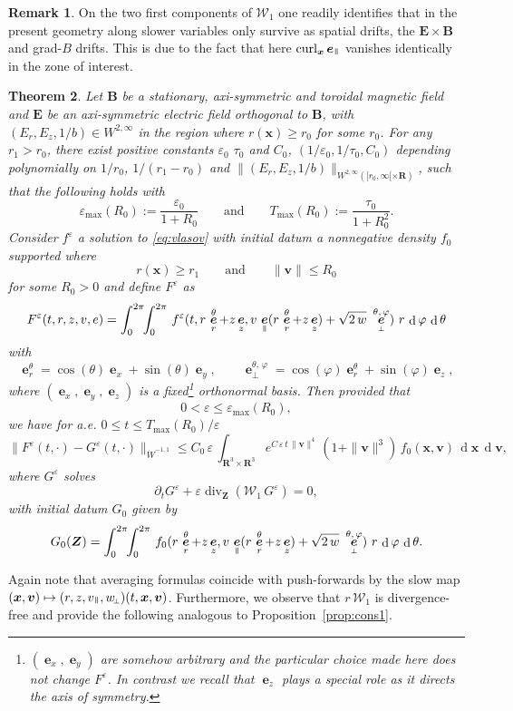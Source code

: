 \documentclass[JEP,XML,SOM,Unicode]{cedram}
\let\mathcal\mathscr
\newcommand\mto{\mathchoice{\longmapsto}{\mapsto}{\mapsto}{\mapsto}}
\newcommand{\sperp}{{\scriptscriptstyle\perp}}
\let\eps\varepsilon
\let\d\partial
\DeclareMathOperator\dD{d}\let\dd\dD
\DeclareMathOperator{\Div}{div}
\DeclareMathOperator{\Curl}{curl}
\theoremstyle{plain}
\newtheorem{theorem}{Theorem}[section]
\theoremstyle{definition}
\newtheorem{remark}[theorem]{Remark}
\newcommand\br{\begin{remark}}
\newcommand\er{\end{remark}}
\newcommand{\be}{\begin{equation}}
\newcommand{\ee}{\end{equation}}
\newcommand{\bt}{\begin{theorem}}
\newcommand{\et}{\end{theorem}}
\newcommand\R{\mathbf R}
\newcommand\bB{{\boldsymbol B}}
\newcommand\bE{{\boldsymbol E}}
\newcommand\bfv{{\boldsymbol v}}
\newcommand\bfx{{\boldsymbol x}}
\newcommand\bfZ{{\boldsymbol Z}}
\newcommand\cW{{\mathcal W}}
\DeclareMathOperator{\beD}{\boldsymbol{e}}
\newcommand\eDx{\beD_x}
\newcommand\eDy{\beD_y}
\newcommand\eDr{\beD_r}
\newcommand\eDz{\beD_z}
\newcommand\eDpar{\beD_\mypar}
\newcommand\eDperp{\beD_\sperp}
\newcommand\vpar{v_\mypar}
\newcommand\eperp{w_{\!\sperp}}
\let\e w
\newcommand\Er{E_r}
\newcommand\Ez{E_z}
\newcommand{\mypar}{{\mkern3mu\vphantom{\perp}\vrule depth 0pt\mkern2mu\vrule depth 0pt\mkern3mu}}
\begin{document}
\br
On the two first components of $\cW_1$ one readily identifies that in the present geometry along slower variables only survive as spatial drifts, the $\bE\times \bB$ and grad-$B$ drifts. This is due to the fact that here $\Curl_\bfx \eDpar$ vanishes identically in the zone of interest.
\er

\bt
\label{th:3}
Let $\bB$ be a stationary, axi-symmetric and toroidal magnetic field and $\bE$ be
an axi-symmetric electric field orthogonal to $\bB$, with $(\Er,\Ez,1/b)\in
W^{2,\infty}$ in the region where $r(\bfx)\geq r_0$ for some
$r_0$. For any $r_1>r_0$, there exist positive constants $\eps_0$ $\tau_0$ and $C_0$, $(1/\eps_0,1/\tau_0,C_0)$ depending polynomially on $1/r_0$, $1/(r_1-r_0)$ and $\|(\Er,\Ez,1/b)\|_{W^{2,\infty}([r_0,\infty[\times\R)}$, such that the following holds with
\[
\eps_{\max}(R_0):=\frac{\eps_0}{1+R_0}\qquad\textrm{and}\qquad
T_{\max}(R_0):=\frac{\tau_0}{1+R_0^2}.
\]
Consider $f^\eps$ a solution to \eqref{eq:vlasov} with initial datum a nonnegative density $f_0$ supported where\vspace*{-3pt}
\[
r(\bfx)\geq r_1\qquad\textrm{and}\qquad \|\bfv\|\leq R_0
\]
for some $R_0>0$ and define $F^\eps$ as
\[
F^\eps(t,r,z,v,e)=\int_0^{2\pi}\!\!\int_0^{2\pi}
\,f^\eps(t,r\,\eDr^\theta+z\eDz,
v\,\eDpar(r\,\eDr^\theta+z\eDz)
+\sqrt{2\,\e}\ \eDperp^{\theta,\,\varphi})\ r\,\dD\varphi\,\dD\theta
\]
with
\[
\eDr^\theta=\cos(\theta)\eDx+\sin(\theta)\eDy,\qquad
\eDperp^{\theta,\,\varphi}=\cos(\varphi)\eDr^\theta+\sin(\varphi)\eDz,
\]
where $(\eDx,\eDy,\eDz)$ is a fixed\footnote{$(\eDx,\eDy)$ are somehow arbitrary and the particular choice made here does not change $F^\eps$. In contrast we recall that $\eDz$ plays a special role as it directs the axis of symmetry.} orthonormal basis. Then provided that
\[
0<\eps\leq \eps_{\max}(R_0),
\]
we have for a.e. $0\leq t \leq T_{\max}(R_0)/\eps$
\[
\|F^\eps(t,\cdot)-G^\eps(t,\cdot)\|_{\dot{W}^{-1,1}}\leq C_0\,\eps\,
\int_{\R^3\times\R^3} e^{C\,\eps\,t\,\|\bfv\|^4}\,(1+\|\bfv\|^3)\,f_0(\bfx,\bfv)\,\dD\bfx\,\dD\bfv,
\]
where $G^\eps$ solves
\be\label{eq:axi}
\d_t G^\eps+\eps\Div_{\bfZ} \left(\cW_1\, G^\eps\right)
=0,
\ee
with initial datum $G_0$ given by
\[
G_0(\bfZ)=
\int_0^{2\pi}\!\!\int_0^{2\pi}
\,f_0(r\,\eDr^\theta+z\eDz,
v\,\eDpar(r\,\eDr^\theta+z\eDz)
+\sqrt{2\,\e}\ \eDperp^{\theta,\,\varphi})\ r\,\dD \varphi\,\dD\theta.
\]
\et

Again note that averaging formulas coincide with push-forwards by the
slow map $(\bfx,\bfv)\mto (r,z,\vpar,\eperp)(t,\bfx,\bfv)$. Furthermore, we observe that $r\,\cW_1$ is divergence-free and provide the following analogous to Proposition~\ref{prop:cons1}.
\end{document}
